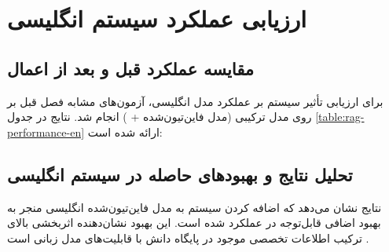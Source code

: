 \documentclass[11pt, a4paper, oneside]{book}
\begin{document}
	\section{ارزیابی عملکرد سیستم  انگلیسی}

	\subsection{مقایسه عملکرد قبل و بعد از اعمال }

	برای ارزیابی تأثیر سیستم  بر عملکرد مدل انگلیسی، آزمون‌های مشابه فصل قبل بر روی مدل ترکیبی (مدل فاین‌تیون‌شده + ) انجام شد. نتایج در جدول \ref{table:rag-performance-en} ارائه شده است:

	\begin{table}[htbp]
		\centering
		\caption{مقایسه عملکرد مدل‌های انگلیسی با و بدون سیستم }
		\label{table:rag-performance-en}
		\begin{latin}
		\end{latin}
	\end{table}


	\subsection{تحلیل نتایج و بهبودهای حاصله در سیستم انگلیسی}

	نتایج نشان می‌دهد که اضافه کردن سیستم  به مدل فاین‌تیون‌شده انگلیسی منجر به بهبود اضافی قابل‌توجه در عملکرد شده است. این بهبود نشان‌دهنده اثربخشی بالای ترکیب اطلاعات تخصصی موجود در پایگاه دانش با قابلیت‌های مدل زبانی است \cite{brown_language_2020}.
\end{document}
